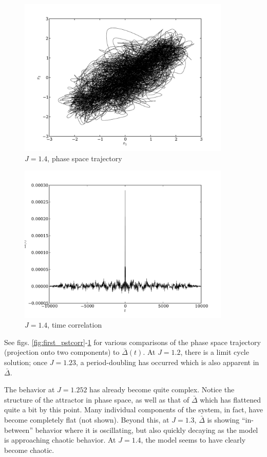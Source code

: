 \documentclass{article} %
\begin{document}
\begin{figure}[p]
	\centering
	\includegraphics[width=0.9\textwidth]{paul_figs/J_1_4}
	\caption{$J=1.4$, phase space trajectory}
\end{figure}
\begin{figure}[p]
	\centering
	\includegraphics[width=0.9\textwidth]{paul_figs/tcorr_J_1_4}
	\caption{$J=1.4$, time correlation}
	\label{fig:last_pstcorr}
\end{figure}

See figs. \ref{fig:first_pstcorr}-\ref{fig:last_pstcorr} for various comparisons of the phase space trajectory (projection onto two components) to $\bar{\Delta}(t)$.  At $J=1.2$, there is a limit cycle solution; once $J=1.23$, a period-doubling has occurred which is also apparent in $\bar{\Delta}$.

The behavior at $J=1.252$ has already become quite complex.  Notice the structure of the attractor in phase space, as well as that of $\bar{\Delta}$ which has flattened quite a bit by this point. Many individual components of the system, in fact, have become completely flat (not shown).  Beyond this, at $J=1.3$, $\bar{\Delta}$ is showing ``in-between'' behavior where it is oscillating, but also quickly decaying as the model is approaching chaotic behavior.  At $J=1.4$, the model seems to have clearly become chaotic.
\end{document}
